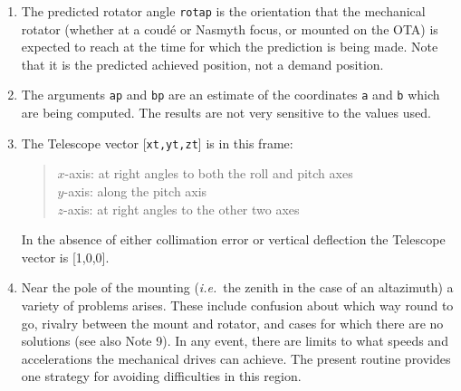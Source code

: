 \documentclass[12pt,fleqn,twoside]{article}
\renewcommand{\_}{{\tt\char'137}}     %
\newcommand{\radec}     {$[\,\alpha,\delta\,]$}
\newcommand{\hadec}     {$[\,h,\delta\,]$}
\newcommand{\azel}      {$[\,Az,El~]$}
\begin{document}
{\begin{enumerate}
      \begin{tabbing}
         xxx \= xxxxxxxxxx \= \kill
         \> {\tt frame  } \> {\tt APPT\_TOPO} \\
         \> {\tt target } \> topocentric apparent \radec \\
         \> {\tt spm1   } \> identity matrix \\
         \> {\tt sst,cst} \> \radec\ $\Rightarrow$ \hadec \\
         \> {\tt spm2   } \> topocentric \hadec\ $\Rightarrow$ {\sc Aim}
      \end{tabbing}
      \begin{tabbing}
         xxx \= xxxxxxxxxx \= \kill
         \> {\tt frame  } \> {\tt AZEL\_TOPO} \\
         \> {\tt target } \> topocentric \azel\ (N thru E) \\
         \> {\tt spm1   } \> identity matrix \\
         \> {\tt sst,cst} \> not used \\
         \> {\tt spm2   } \> topocentric \azel\ $\Rightarrow$ {\sc Aim}
      \end{tabbing}

      ICRS $\approx$ FK5 J2000 to better than 25 mas.
\item The predicted rotator angle {\tt rotap} is the orientation that the
      mechanical rotator (whether at a coud\'e or Nasmyth focus, or
      mounted on the OTA) is expected to reach at the time for which
      the prediction is being made.  Note that it is the predicted
      achieved position, not a demand position.
\item The arguments {\tt ap} and {\tt bp} are an estimate of the coordinates
      {\tt a} and {\tt b} which are being computed.
      The results are not very
      sensitive to the values used.
\item The {\sc Telescope} vector [{\tt xt,yt,zt}] is in this frame:
      \begin{quote}
      $x$-axis:  at right angles to both the roll and pitch axes \\
      $y$-axis:  along the pitch axis \\
      $z$-axis:  at right angles to the other two axes
      \end{quote}
      In the absence of either collimation error or vertical deflection
      the {\sc Telescope} vector is [1,0,0].
\item Near the pole of the mounting ({\it i.e.}~the zenith in the case of an
      altazimuth) a variety of problems arises.  These include
      confusion about which way round to go, rivalry between the mount
      and rotator, and cases for which there are no solutions (see also
      Note 9).  In any event, there are limits to what speeds and
      accelerations the mechanical drives can achieve.  The present
      routine provides one strategy for avoiding difficulties in this
      region.


\end{enumerate}}
\end{document}
